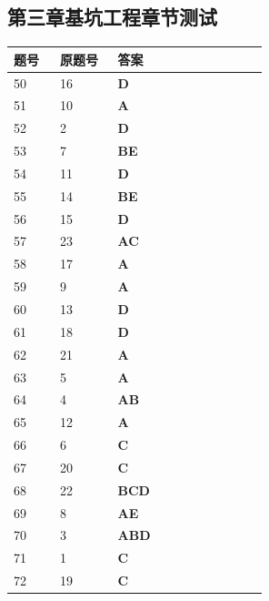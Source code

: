 \documentclass[UTF8,fontset=windows,11pt]{ctexart}
\begin{document}
\subsection*{第三章基坑工程章节测试}
\begin{longtable}{p{0.16\linewidth}p{0.2\linewidth}p{0.52\linewidth}}
\textbf{\textcolor{examnavy}{题号}} & \textbf{\textcolor{examnavy}{原题号}} & \textbf{\textcolor{answergreen}{答案}} \\
\hline
50 & 16 & \textbf{\textcolor{answergreen}{D}} \\
51 & 10 & \textbf{\textcolor{answergreen}{A}} \\
52 & 2 & \textbf{\textcolor{answergreen}{D}} \\
53 & 7 & \textbf{\textcolor{answergreen}{BE}} \\
54 & 11 & \textbf{\textcolor{answergreen}{D}} \\
55 & 14 & \textbf{\textcolor{answergreen}{BE}} \\
56 & 15 & \textbf{\textcolor{answergreen}{D}} \\
57 & 23 & \textbf{\textcolor{answergreen}{AC}} \\
58 & 17 & \textbf{\textcolor{answergreen}{A}} \\
59 & 9 & \textbf{\textcolor{answergreen}{A}} \\
60 & 13 & \textbf{\textcolor{answergreen}{D}} \\
61 & 18 & \textbf{\textcolor{answergreen}{D}} \\
62 & 21 & \textbf{\textcolor{answergreen}{A}} \\
63 & 5 & \textbf{\textcolor{answergreen}{A}} \\
64 & 4 & \textbf{\textcolor{answergreen}{AB}} \\
65 & 12 & \textbf{\textcolor{answergreen}{A}} \\
66 & 6 & \textbf{\textcolor{answergreen}{C}} \\
67 & 20 & \textbf{\textcolor{answergreen}{C}} \\
68 & 22 & \textbf{\textcolor{answergreen}{BCD}} \\
69 & 8 & \textbf{\textcolor{answergreen}{AE}} \\
70 & 3 & \textbf{\textcolor{answergreen}{ABD}} \\
71 & 1 & \textbf{\textcolor{answergreen}{C}} \\
72 & 19 & \textbf{\textcolor{answergreen}{C}} \\
\end{longtable}
\vspace{0.4em}
\end{document}
